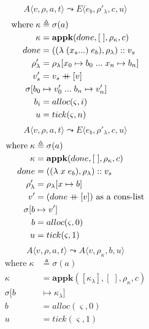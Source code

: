 \documentclass[12pt,draft]{article}
\newcommand\mdoubleplus{\ensuremath{\mathbin{+\mkern-9mu+}}}
\newcommand{\lamsyn}[2]{(\lambda\;(#1 ...)\;#2)}
\newcommand{\vararglamsyn}[2]{(\lambda\;#1\;#2)}
\begin{document}
\begin{multicols*}{2}
\[
A\langle
v , \rho , a , t
\rangle
\leadsto
E\langle
e_b , \rho'_{\lambda} , c , u
\rangle
\]
\vspace{-9mm}
\begin{align*}
\text{where}\; \kappa &\triangleq \sigma(a) \\
\kappa &= \textbf{appk}(done, [\;], \rho_{\kappa}, c) \\
done &= (\lamsyn{x_s}{e_b}, \rho_{\lambda}) :: v_s \\
\rho'_{\lambda} &= \rho_{\lambda}[x_0 \mapsto b_0 \;...\; x_n \mapsto b_n] \\
v'_s &= v_s \mdoubleplus [v] \\
\sigma[b_0 &\mapsto v'_0 \;...\; b_n \mapsto v'_n] \\
b_i &= alloc(\varsigma, i) \\
u &= tick(\varsigma, n)
\end{align*}
\[
A\langle
v , \rho , a , t
\rangle
\leadsto
E\langle
e_b , \rho'_{\lambda} , c , u
\rangle
\]
\vspace{-9mm}
\begin{align*}
\text{where}\; \kappa &\triangleq \sigma(a) \\
\kappa &= \textbf{appk}(done, [\;], \rho_{\kappa}, c) \\
done &= (\vararglamsyn{x}{e_b}, \rho_{\lambda}) :: v_s \\
\rho'_{\lambda} &= \rho_{\lambda}[x \mapsto b] \\
v' &= (done \mdoubleplus [v]) \text{ as a cons-list} \\
\sigma[b &\mapsto v'] \\
b &= alloc(\varsigma, 0) \\
u &= tick(\varsigma, 1)
\end{align*}
\[
A\langle
v , \rho , a , t
\rangle
\leadsto
A\langle
v , \rho_{\kappa} , b , u
\rangle
\]
\vspace{-10mm}
\begin{align*}
\text{where}\; \kappa &\triangleq \sigma(a) \\
\kappa &= \textbf{appk}([\kappa_{\lambda}], [\;], \rho_{\kappa}, c) \\
\sigma[b &\mapsto \kappa_{\lambda}] \\
b &= alloc(\varsigma, 0) \\
u &= tick(\varsigma, 1)
\end{align*}
\end{multicols*}
\end{document}
